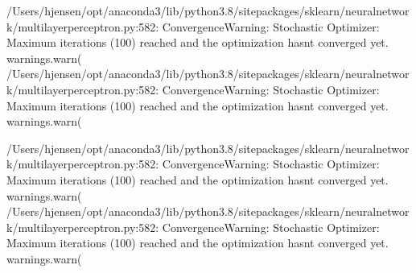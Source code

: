 \documentclass[letterpaper,10pt,english]{sphinxmanual}
\begin{document}
\begin{sphinxVerbatim}[commandchars=\\\{\}]
      
   
\end{sphinxVerbatim}

\begin{sphinxVerbatim}[commandchars=\\\{\}]
/Users/hjensen/opt/anaconda3/lib/python3.8/site\PYGZhy{}packages/sklearn/neural\PYGZus{}network/\PYGZus{}multilayer\PYGZus{}perceptron.py:582: ConvergenceWarning: Stochastic Optimizer: Maximum iterations (100) reached and the optimization hasn\PYGZsq{}t converged yet.
  warnings.warn(
/Users/hjensen/opt/anaconda3/lib/python3.8/site\PYGZhy{}packages/sklearn/neural\PYGZus{}network/\PYGZus{}multilayer\PYGZus{}perceptron.py:582: ConvergenceWarning: Stochastic Optimizer: Maximum iterations (100) reached and the optimization hasn\PYGZsq{}t converged yet.
  warnings.warn(
\end{sphinxVerbatim}

\begin{sphinxVerbatim}[commandchars=\\\{\}]
/Users/hjensen/opt/anaconda3/lib/python3.8/site\PYGZhy{}packages/sklearn/neural\PYGZus{}network/\PYGZus{}multilayer\PYGZus{}perceptron.py:582: ConvergenceWarning: Stochastic Optimizer: Maximum iterations (100) reached and the optimization hasn\PYGZsq{}t converged yet.
  warnings.warn(
/Users/hjensen/opt/anaconda3/lib/python3.8/site\PYGZhy{}packages/sklearn/neural\PYGZus{}network/\PYGZus{}multilayer\PYGZus{}perceptron.py:582: ConvergenceWarning: Stochastic Optimizer: Maximum iterations (100) reached and the optimization hasn\PYGZsq{}t converged yet.
  warnings.warn(
\end{sphinxVerbatim}
\end{document}
